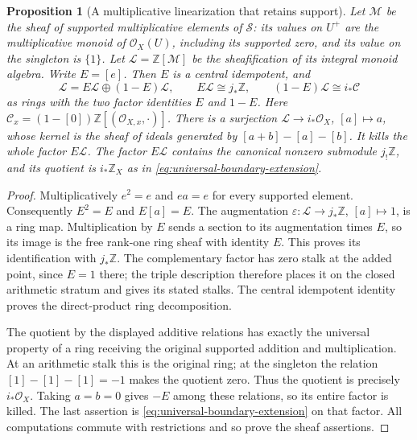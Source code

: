 \documentclass[11pt,a4paper]{article}
\newtheorem{proposition}[theorem]{Proposition}
\theoremstyle{definition}\newtheorem{definition}[theorem]{Definition}
\begin{document}
\begin{proposition}[A multiplicative linearization that retains support]
\label{prop:monoid-linearization}
Let $\mathcal M$ be the sheaf of supported multiplicative elements of
$\mathcal S$: its values on $U^+$ are the multiplicative monoid of
$\mathcal O_X(U)$, including its supported zero, and its value on the
singleton is $\{1\}$. Let $\mathcal L=\mathbb Z[\mathcal M]$ be the
sheafification of its integral monoid algebra. Write $E=[e]$.
Then $E$ is a central idempotent, and
\[
 \mathcal L=E\mathcal L\oplus(1-E)\mathcal L,
 \qquad E\mathcal L\cong j_*\mathbb Z,
 \qquad (1-E)\mathcal L\cong i_*\mathcal C
 \tag{RP19}\label{eq:monoid-splitting}
\]
as rings with the two factor identities $E$ and $1-E$. Here
$\mathcal C_x=(1-[0])\mathbb Z[(\mathcal O_{X,x},\cdot)]$.
There is a surjection $\mathcal L\to i_*\mathcal O_X$, $[a]\mapsto a$,
whose kernel is the sheaf of ideals generated by
$[a+b]-[a]-[b]$. It kills the whole factor $E\mathcal L$.
The factor $E\mathcal L$ contains the canonical nonzero submodule
$j_!\mathbb Z$, and its quotient is $i_*\mathbb Z_X$ as in
\eqref{eq:universal-boundary-extension}.
\end{proposition}
\begin{proof}
Multiplicatively $e^2=e$ and $ea=e$ for every supported element.
Consequently $E^2=E$ and $E[a]=E$. The augmentation
$\varepsilon:\mathcal L\to j_*\mathbb Z$, $[a]\mapsto1$, is a ring
map. Multiplication by $E$ sends a section to its augmentation times
$E$, so its image is the free rank-one ring sheaf with identity $E$.
This proves its identification with $j_*\mathbb Z$. The complementary
factor has zero stalk at the added point, since $E=1$ there; the triple
description therefore places it on the closed arithmetic stratum and
gives its stated stalks. The central idempotent identity proves the
direct-product ring decomposition.

The quotient by the displayed additive relations has exactly the
universal property of a ring receiving the original supported addition
and multiplication. At an arithmetic stalk this is the original ring;
at the singleton the relation $[1]-[1]-[1]=-1$ makes the quotient zero.
Thus the quotient is precisely $i_*\mathcal O_X$. Taking $a=b=0$ gives
$-E$ among these relations, so its entire factor is killed.
The last assertion is \eqref{eq:universal-boundary-extension} on that
factor. All computations commute with restrictions and so prove the
sheaf assertions.
\end{proof}
\end{document}

